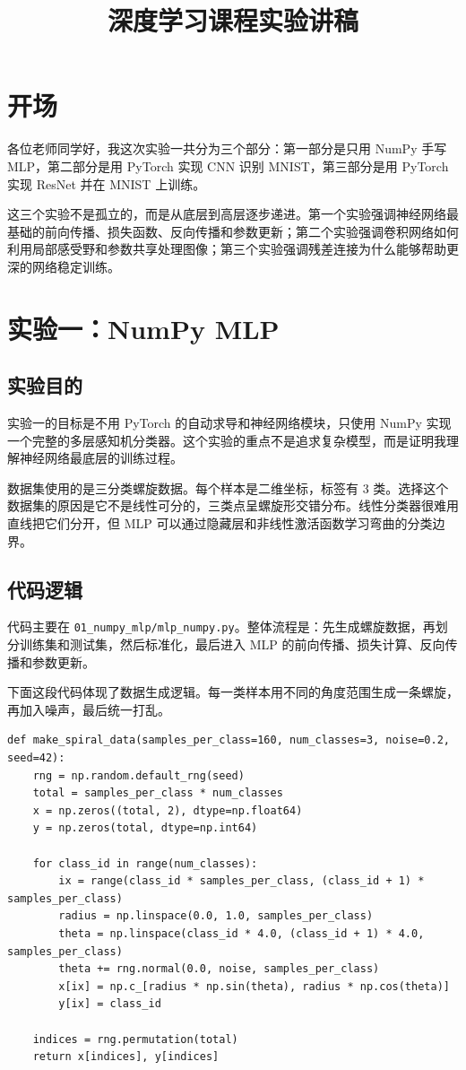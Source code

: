 \documentclass[UTF8]{ctexart}
\title{深度学习课程实验讲稿}
\author{}
\date{}
\begin{document}
\maketitle

\section*{开场}
各位老师同学好，我这次实验一共分为三个部分：第一部分是只用 NumPy 手写 MLP，第二部分是用 PyTorch 实现 CNN 识别 MNIST，第三部分是用 PyTorch 实现 ResNet 并在 MNIST 上训练。

这三个实验不是孤立的，而是从底层到高层逐步递进。第一个实验强调神经网络最基础的前向传播、损失函数、反向传播和参数更新；第二个实验强调卷积网络如何利用局部感受野和参数共享处理图像；第三个实验强调残差连接为什么能够帮助更深的网络稳定训练。

\section{实验一：NumPy MLP}
\subsection{实验目的}
实验一的目标是不用 PyTorch 的自动求导和神经网络模块，只使用 NumPy 实现一个完整的多层感知机分类器。这个实验的重点不是追求复杂模型，而是证明我理解神经网络最底层的训练过程。

数据集使用的是三分类螺旋数据。每个样本是二维坐标，标签有 3 类。选择这个数据集的原因是它不是线性可分的，三类点呈螺旋形交错分布。线性分类器很难用直线把它们分开，但 MLP 可以通过隐藏层和非线性激活函数学习弯曲的分类边界。

\subsection{代码逻辑}
代码主要在 \texttt{01\_numpy\_mlp/mlp\_numpy.py}。整体流程是：先生成螺旋数据，再划分训练集和测试集，然后标准化，最后进入 MLP 的前向传播、损失计算、反向传播和参数更新。

下面这段代码体现了数据生成逻辑。每一类样本用不同的角度范围生成一条螺旋，再加入噪声，最后统一打乱。

\begin{lstlisting}[caption={实验一：三分类螺旋数据生成}]
def make_spiral_data(samples_per_class=160, num_classes=3, noise=0.2, seed=42):
    rng = np.random.default_rng(seed)
    total = samples_per_class * num_classes
    x = np.zeros((total, 2), dtype=np.float64)
    y = np.zeros(total, dtype=np.int64)

    for class_id in range(num_classes):
        ix = range(class_id * samples_per_class, (class_id + 1) * samples_per_class)
        radius = np.linspace(0.0, 1.0, samples_per_class)
        theta = np.linspace(class_id * 4.0, (class_id + 1) * 4.0, samples_per_class)
        theta += rng.normal(0.0, noise, samples_per_class)
        x[ix] = np.c_[radius * np.sin(theta), radius * np.cos(theta)]
        y[ix] = class_id

    indices = rng.permutation(total)
    return x[indices], y[indices]
\end{lstlisting}
\end{document}
